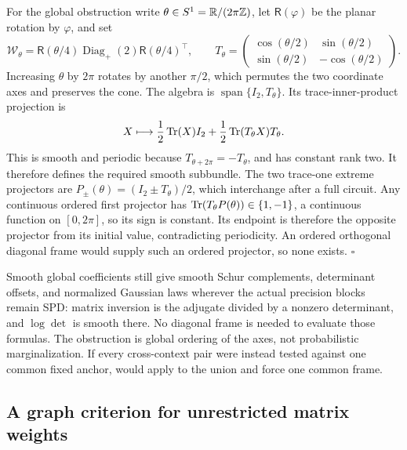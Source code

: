 For the global obstruction write
\(\theta\in S^1=\mathbb R/(2\pi\mathbb Z)\), let
\(\mathsf R(\varphi)\) be the planar rotation by \(\varphi\), and set
\begin{equation}
\mathscr W_\theta=
\mathsf R(\theta/4)\operatorname{Diag}_+(2)
\mathsf R(\theta/4)^\top,\qquad
T_\theta=
\begin{pmatrix}
\cos(\theta/2)&\sin(\theta/2)\\
\sin(\theta/2)&-\cos(\theta/2)
\end{pmatrix}.
\label{eq:cg-kron-circle-cone}
\end{equation}
Increasing \(\theta\) by \(2\pi\) rotates by another \(\pi/2\),
which permutes the two coordinate axes and preserves the cone.
The algebra is \(\operatorname{span}\{I_2,T_\theta\}\).
Its trace-inner-product projection is
\begin{equation}
X\longmapsto
\frac12\operatorname{Tr}(X)I_2+\frac12\operatorname{Tr}(T_\theta X)T_\theta.
\label{eq:cg-kron-circle-algebra-projector}
\end{equation}
This is smooth and periodic because
\(T_{\theta+2\pi}=-T_\theta\), and has constant rank two.
It therefore defines the required smooth subbundle. The two
trace-one extreme projectors are
\(P_\pm(\theta)=(I_2\pm T_\theta)/2\), which interchange after a
full circuit. Any continuous ordered first projector has
\(\operatorname{Tr}(T_\theta P(\theta))\in\{1,-1\}\), a continuous function
on \([0,2\pi]\), so its sign is constant. Its endpoint is therefore
the opposite projector from its initial value, contradicting
periodicity. An ordered orthogonal diagonal frame would supply such
an ordered projector, so none exists. \(\square\)

Smooth global coefficients still give smooth Schur complements, determinant
offsets, and normalized Gaussian laws wherever the actual precision blocks
remain SPD: matrix inversion is the adjugate divided by a nonzero
determinant, and \(\log\det\) is smooth there. No diagonal frame is
needed to evaluate those formulas. The obstruction is global ordering
of the axes, not probabilistic marginalization. If every cross-context
pair were instead tested against one common fixed anchor,
 would apply to the union
and force one common frame. 

\subsection{A graph criterion for unrestricted matrix weights}
\label{sec:cg-kron-graph-boundary}

